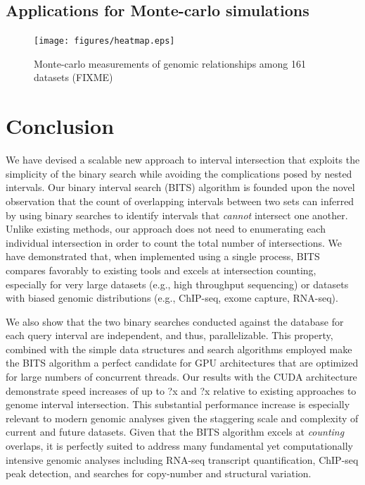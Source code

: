 \documentclass{bioinfo}
\begin{document}
	

	\subsection{Applications for Monte-carlo simulations}
	
	\begin{figure}[t]
		\texttt{[image: figures/heatmap.eps]}
		\caption[]{Monte-carlo measurements of genomic relationships among 161 datasets (FIXME)}
	\end{figure}
	

	\section{Conclusion}
	
	We have devised a scalable new approach to interval intersection
	that exploits the simplicity of the binary search while avoiding the complications
	posed by nested intervals. Our binary interval search (BITS) algorithm is founded upon the novel 
	observation that the count of overlapping intervals between two sets 
	can inferred by using binary searches to identify intervals that \emph{cannot}
	intersect one another. Unlike existing methods, our approach does not need
	to enumerating each individual intersection in order to count the total number 
	of intersections. We have demonstrated that, when implemented using a single process,
	BITS compares favorably to existing tools and excels at intersection counting, especially
	for very large datasets (e.g., high throughput sequencing) or datasets with biased
	genomic distributions (e.g., ChIP-seq, exome capture, RNA-seq).
	
	We also show that the two binary searches conducted
	against the database for each query interval are independent, and thus, parallelizable.
	This property, combined with the simple data structures and search algorithms employed
	make the BITS algorithm a perfect candidate for GPU architectures that are optimized for
	large numbers of concurrent threads. Our results with the CUDA architecture
	demonstrate speed increases of up to ?x and ?x relative to existing 
	approaches to genome interval intersection. This substantial performance increase 
	is especially relevant to modern genomic analyses given the staggering scale and complexity 
	of current and future datasets.  Given that the BITS algorithm excels at \emph{counting}
	overlaps, it is perfectly suited to address many fundamental yet computationally
	intensive genomic analyses including RNA-seq transcript quantification, ChIP-seq
	peak detection, and searches for copy-number and structural variation.
	
\end{document}
